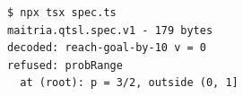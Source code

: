 \begin{Verbatim}[fontsize=\small,frame=leftline,rulecolor=\color{accentmid},framesep=3mm,xleftmargin=3mm]
$ npx tsx spec.ts
maitria.qtsl.spec.v1 - 179 bytes
decoded: reach-goal-by-10 v = 0
refused: probRange
  at (root): p = 3/2, outside (0, 1]
\end{Verbatim}

